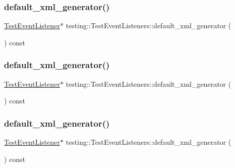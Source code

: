 \subsubsection{\texorpdfstring{default\_xml\_generator()}{default\_xml\_generator()}\hspace{0.1cm}{\footnotesize\ttfamily [1/3]}}
{\footnotesize\ttfamily \mbox{\hyperlink{classtesting_1_1_test_event_listener}{Test\+Event\+Listener}}$\ast$ testing\+::\+Test\+Event\+Listeners\+::default\+\_\+xml\+\_\+generator (\begin{DoxyParamCaption}{ }\end{DoxyParamCaption}) const\hspace{0.3cm}{\ttfamily [inline]}}

\mbox{\label{classtesting_1_1_test_event_listeners_aa880de6ddfc3f5824371853c6846abbd}} 
\subsubsection{\texorpdfstring{default\_xml\_generator()}{default\_xml\_generator()}\hspace{0.1cm}{\footnotesize\ttfamily [2/3]}}
{\footnotesize\ttfamily \mbox{\hyperlink{classtesting_1_1_test_event_listener}{Test\+Event\+Listener}}$\ast$ testing\+::\+Test\+Event\+Listeners\+::default\+\_\+xml\+\_\+generator (\begin{DoxyParamCaption}{ }\end{DoxyParamCaption}) const\hspace{0.3cm}{\ttfamily [inline]}}

\mbox{\label{classtesting_1_1_test_event_listeners_aa880de6ddfc3f5824371853c6846abbd}} 
\subsubsection{\texorpdfstring{default\_xml\_generator()}{default\_xml\_generator()}\hspace{0.1cm}{\footnotesize\ttfamily [3/3]}}
{\footnotesize\ttfamily \mbox{\hyperlink{classtesting_1_1_test_event_listener}{Test\+Event\+Listener}}$\ast$ testing\+::\+Test\+Event\+Listeners\+::default\+\_\+xml\+\_\+generator (\begin{DoxyParamCaption}{ }\end{DoxyParamCaption}) const\hspace{0.3cm}{\ttfamily [inline]}}

